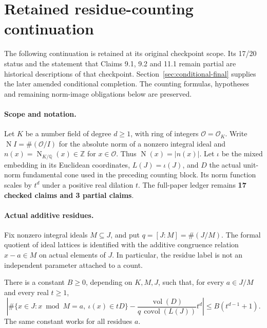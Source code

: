 \clearpage
\section{Retained residue-counting continuation}
\label{sec:historical-residue-continuation}
The following continuation is retained at its original checkpoint scope. Its 17/20 status and the statement that Claims 9.1, 9.2 and 11.1 remain partial are historical descriptions of that checkpoint. Section~\ref{sec:conditional-final} supplies the later amended conditional completion. The counting formulas, hypotheses and remaining norm-image obligations below are preserved.
\providecommand{\OO}{\mathcal O}
\providecommand{\ZZ}{\mathbb Z}
\providecommand{\RR}{\mathbb R}
\providecommand{\CC}{\mathbb C}
\providecommand{\NN}{\mathbb N}
\providecommand{\Cl}{\operatorname{Cl}}
\providecommand{\Nm}{\operatorname N}
\providecommand{\vol}{\operatorname{vol}}
\providecommand{\covol}{\operatorname{covol}}
\providecommand{\absn}[1]{\lvert #1\rvert}




\paragraph{Scope and notation.}
Let $K$ be a number field of degree $d\geq1$, with ring of integers
$\OO=\OO_K$. Write $\Nm I=\#(\OO/I)$ for the absolute norm of a nonzero
integral ideal and $n(x)=\Nm_{K/\mathbb Q}(x)\in\ZZ$ for $x\in\OO$.
Thus $\Nm(x)=\absn{n(x)}$. Let $\iota$ be the mixed embedding in its
Euclidean coordinates, $L(J)=\iota(J)$, and $D$ the actual unit-norm
fundamental cone used in the preceding counting block. Its norm function
scales by $t^d$ under a positive real dilation $t$.
The full-paper ledger remains \textbf{17 checked claims and 3 partial claims}.

\paragraph{Actual additive residues.}
Fix nonzero integral ideals $M\subseteq J$, and put $q=[J:M]=\#(J/M)$.
The formal quotient of ideal lattices is identified with the additive
congruence relation $x-a\in M$ on actual elements of $J$. In particular,
the residue label is not an independent parameter attached to a count.

\begin{proposition}\label{prop:residue-count}
There is a constant $B\geq0$, depending on $K,M,J$, such that, for every
$a\in J/M$ and every real $t\geq1$,
\[
 \left|\#\{x\in J:x\bmod M=a,\ \iota(x)\in tD\}
 -\frac{\vol(D)}{q\,\covol(L(J))}t^d\right|
 \leq B(t^{d-1}+1).
\]
The same constant works for all residues $a$.
\end{proposition}

